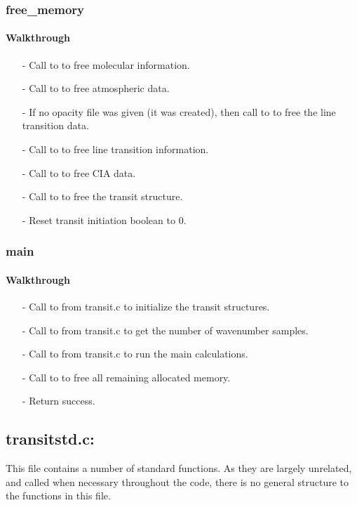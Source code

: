 \documentclass[letterpaper,12pt]{article}
\begin{document}
\subsubsection{free\_memory}
\paragraph{Walkthrough}
\begin{enumerate}[leftmargin=10pt, noitemsep, parsep=0pt, topsep=0ex]
\item[-] Call to  to free molecular information.
\item[-] Call to  to free atmospheric data.
\item[-] If no opacity file was given (it was created), then call to  to free the line transition data.
\item[-] Call to  to free line transition information.
\item[-] Call to  to free CIA data.
\item[-] Call to  to free the transit structure.
\item[-] Reset transit initiation boolean to 0.
\end{enumerate}

\subsubsection{main}
\paragraph{Walkthrough}
\begin{enumerate}[leftmargin=10pt, noitemsep, parsep=0pt, topsep=0ex]
\item[-] Call to  from transit.c to initialize the transit structures.
\item[-] Call to  from transit.c to get the number of wavenumber samples.
\item[-] Call to  from transit.c to run the main calculations.
\item[-] Call to  to free all remaining allocated memory.
\item[-] Return success.
\end{enumerate}

\subsection{transitstd.c:}
This file contains a number of standard functions. As they are largely unrelated, and called when necessary throughout the code, there is no general structure to the functions in this file.
\end{document}
